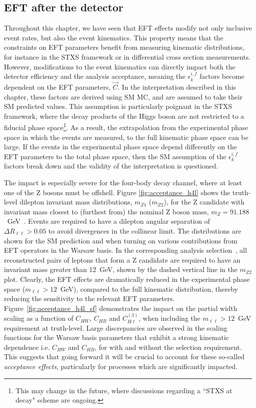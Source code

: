 \subsection{EFT after the detector}\label{sec:eft_acceptance_corrections}
Throughout this chapter, we have seen that EFT effects modify not only inclusive event rates, but also the event kinematics. This property means that the constraints on EFT parameters benefit from measuring kinematic distributions, for instance in the STXS framework or in differential cross section measurements. However, modifications to the event kinematics can directly impact both the detector efficiency and the analysis acceptance, meaning the $\epsilon^{i,f}_k$ factors become dependent on the EFT parameters, $\vec{C}$. In the interpretation described in this chapter, these factors are derived using SM MC, and are assumed to take their SM predicted values. This assumption is particularly poignant in the STXS framework, where the decay products of the Higgs boson are not restricted to a fiducial phase space\footnote{This may change in the future, where discussions regarding a ``STXS at decay" scheme are ongoing.}. As a result, the extrapolation from the experimental phase space in which the events are measured, to the full kinematic phase space can be large. If the events in the experimental phase space depend differently on the EFT parameters to the total phase space, then the SM assumption of the $\epsilon^{i,f}_k$ factors break down and the validity of the interpretation is questioned. 

The impact is especially severe for the four-body \Hfl decay channel, where at least one of the Z bosons must be offshell. Figure \ref{fig:acceptance_h4l} shows the truth-level dilepton invariant mass distributions, $m_{Z1}$ ($m_{Z2}$), for the Z candidate with invariant mass closest to (furthest from) the nominal Z boson mass, $m_Z=91.188$~GeV~\cite{Zyla:2020zbs}. Events are required to have a dilepton angular separation of $\Delta R_{\ell\ell} > 0.05$ to avoid divergences in the collinear limit. The distributions are shown for the SM prediction and when turning on various contributions from EFT operators in the Warsaw basis. In the corresponding analysis selection~\cite{Sirunyan:2021rug}, all reconstructed pairs of leptons that form a Z candidate are required to have an invariant mass greater than 12~GeV, shown by the dashed vertical line in the $m_{Z2}$ plot. Clearly, the EFT effects are dramatically reduced in the experimental phase space ($m_{\ell\ell}>12$~GeV), compared to the full kinematic distribution, thereby reducing the sensitivity to the relevant EFT parameters. Figure~\ref{fig:acceptance_h4l_sf} demonstrates the impact on the \HZZ partial width scaling as a function of $C_{HW}$, $C_{HB}$ and $C^{(3)}_{H\ell}$, when including the $m_{\ell\ell}>12$~GeV requirement at truth-level. Large discrepancies are observed in the scaling functions for the Warsaw basis parameters that exhibit
a strong kinematic dependence i.e. $C_{HW}$ and $C_{HB}$, for with and without the selection requirement. This suggests that going forward it will be crucial to account for these so-called \textit{acceptance effects}, particularly for processes which are significantly impacted.

